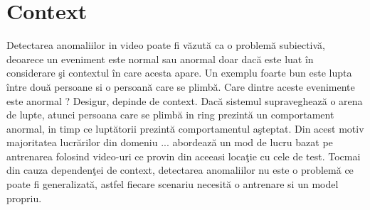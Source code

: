 \documentclass[a4paper,12pt]{report}
\begin{document}
\section{Context}
\quad Detectarea anomaliilor in video poate fi văzută ca o problemă subiectivă, deoarece un eveniment este normal sau anormal doar dacă este luat în considerare şi contextul în care acesta apare. Un exemplu foarte bun este lupta între două persoane si o persoană care se plimbă. Care dintre aceste evenimente este anormal ? Desigur, depinde de context. Dacă sistemul supraveghează o arena de lupte, atunci persoana care se plimbă in ring prezintă un comportament anormal, in timp ce luptătorii prezintă comportamentul aşteptat. Din acest motiv majoritatea lucrărilor din domeniu \cite{cheng2015,ionescu2019object,sultani2018}...  abordează un mod de lucru bazat pe antrenarea folosind video-uri ce provin din aceeasi locaţie cu cele de test. Tocmai din cauza dependenţei de context, detectarea anomaliilor nu este o problemă ce poate fi generalizată, astfel fiecare scenariu necesită o antrenare si un model propriu. \par
\end{document}

